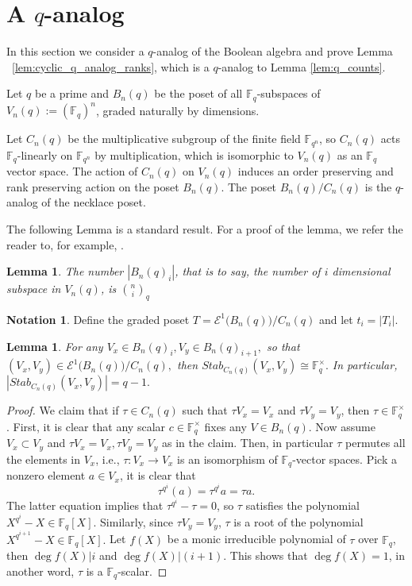 \documentclass[10 pt]{amsart}
\theoremstyle{plain}
\newtheorem{lem}[thm]{Lemma}
\theoremstyle{definition}
\newtheorem{note}[thm]{Notation}
\theoremstyle{remark}
\numberwithin{equation}{section}
\newcommand\BF{{\mathbb F}}
\begin{document}
\section{A $q$-analog}
\label{sec:q_analog}

In this section we consider a $q$-analog of the Boolean algebra and prove Lemma ~\ref{lem:cyclic_q_analog_ranks}, which is a $q$-analog to Lemma \ref{lem:q_counts}.

Let $q$ be a prime and $B_n(q)$ be the poset of all $\BF_q$-subspaces of $V_n(q) := (\BF_q)^n$,  graded naturally by dimensions. 

Let $C_n(q)$ be the multiplicative subgroup of the finite field $\BF_{q^n}$, so $C_n(q)$ acts $\BF_q$-linearly on $\BF_{q^n}$ by multiplication, which is isomorphic to $V_n(q)$ as an $\BF_q$ vector space. The action of $C_n(q)$ on $V_n(q)$ induces an order preserving and rank preserving action on the poset $B_n(q)$. The poset $B_n(q)/C_n(q)$ is the $q$-analog of the necklace poset. 

The following Lemma is a standard result. For a proof of the lemma, we refer the reader to, for example, \cite{enumerative_comb}.

\begin{lem}
\label{q:number_subspaces}
The number $|B_n(q)_i|$, that is to say, the number of $i$ dimensional subspace in $V_n(q)$, is ${n \choose i}_q$
\end{lem}

\begin{note}
Define the graded poset $T = \mathcal E^1 \big(B_n(q)\big)/C_n(q)$ and let $t_i = |T_i|.$
\end{note}

\begin{lem}
\label{lem:q_stabilizer}
For any $V_x \in B_n(q)_i,V_y \in B_n(q)_{i+1},$ so that $(V_x, V_y) \in \mathcal E^1 \big(B_n(q)\big)/C_n(q),$ then $Stab_{C_n(q)}(V_x , V_y) \cong \BF_q^\times.$ In particular, $|Stab_{C_n(q)}(V_x , V_y)|=q-1.$ 
\end{lem}
\begin{proof}
We claim that if $\tau \in C_n(q)$ such that $\tau V_x = V_x$ and $\tau V_y = V_y$, then $\tau \in \BF_q^\times$. First, it is clear that any scalar $c \in \BF_q^\times$  fixes any $V \in B_n(q)$. Now assume $V_x \subset V_y$ and $\tau V_x = V_x, \tau V_y = V_y$ as in the claim. Then, in particular $\tau$ permutes all the elements in $V_x$, i.e., $\tau: V_x \rightarrow V_x$ is an isomorphism of $\BF_q$-vector spaces. Pick a nonzero element $a \in V_x$,  it is clear that $$\tau^{q^i} (a) = \tau^{q^i} a = \tau a.$$ The latter equation implies that $\tau^{q^i} - \tau = 0$, so $\tau$ satisfies the polynomial $X^{q^{i}} - X \in \BF_q[X]$. Similarly, since $\tau V_y = V_y$, $\tau$ is a root of the polynomial $X^{q^{i+1}} - X \in\BF_q[X].$  Let $f(X)$ be a monic irreducible polynomial of $\tau$ over $\BF_q$, then $\deg f(X) | i $ and $\deg f(X) | (i+1)$. This shows that $\deg f(X) = 1$, in another word, $\tau$ is a $\BF_q$-scalar. 
\end{proof}
\end{document}
